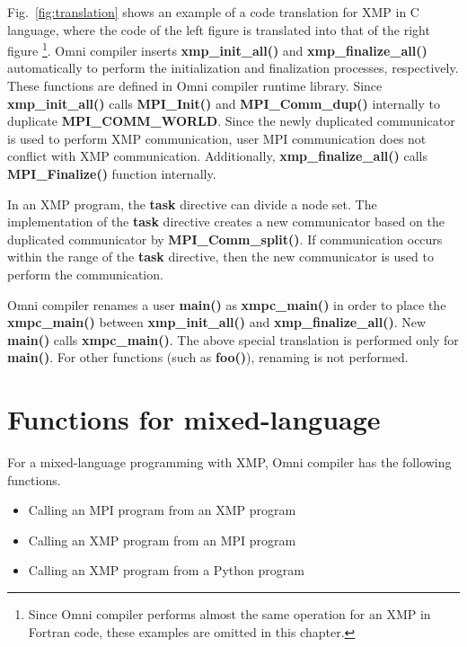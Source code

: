 \documentclass[graybox]{svmult}
\begin{document}
Fig.~\ref{fig:translation} shows an example of a code translation for XMP in C language, where the code of the left figure is translated into that of the right figure
\footnote{Since Omni compiler performs almost the same operation for an XMP in Fortran code, these examples are omitted in this chapter.}.
Omni compiler inserts {\bf xmp\_init\_all()} and {\bf xmp\_finalize\_all()}  automatically  to perform the initialization and finalization processes, respectively.
These functions are defined in Omni compiler runtime library. 
Since  {\bf xmp\_init\_all()} calls  {\bf MPI\_Init()} and {\bf MPI\_Comm\_dup()} internally to duplicate {\bf MPI\_COMM\_WORLD}.
Since the newly duplicated communicator is  used to perform XMP communication,
user MPI communication does not conflict with  XMP communication.
Additionally,  {\bf xmp\_finalize\_all()}  calls  {\bf MPI\_Finalize()} function internally.

In an XMP program,
the \textbf{task} directive can divide a node set.
The implementation of the \textbf{task} directive creates a new communicator based on the duplicated communicator by  {\bf MPI\_Comm\_split()}.
If communication occurs within the range of the \textbf{task} directive,
then the new communicator is used to perform the communication.

Omni compiler renames a user {\bf main()} as  {\bf xmpc\_main()} in order to place the {\bf xmpc\_main()} between  {\bf xmp\_init\_all()} and {\bf xmp\_finalize\_all()}.
New {\bf main()} calls {\bf xmpc\_main()}.
The above special translation is performed only for {\bf main()}.
For other functions (such as {\bf foo()}), renaming is not performed.
\section{Functions for mixed-language}
For a mixed-language programming with XMP, Omni compiler has the following functions.

\begin{itemize}
\item Calling an MPI program from an XMP program
\item Calling an XMP program from an MPI program
\item Calling an XMP program from a Python program
\end{itemize}
\end{document}
